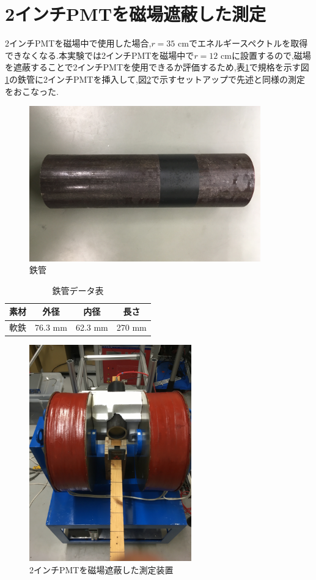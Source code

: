 \section{2インチPMTを磁場遮蔽した測定}
2インチPMTを磁場中で使用した場合,$r=35$ cmでエネルギースペクトルを取得できなくなる.本実験では2インチPMTを磁場中で$r=12$ cmに設置するので,磁場を遮蔽することで2インチPMTを使用できるか評価するため,表\ref{ironpipedata}で規格を示す図\ref{ironpipe}の鉄管に2インチPMTを挿入して,図\ref{2inchinFe}で示すセットアップで先述と同様の測定をおこなった.

\begin{figure}[tbp]
	\centering
		\includegraphics[width=10cm]{fig/iguchi/ironpipe.JPG}
	\caption{鉄管}
	\label{ironpipe}
\end{figure}

\begin{table}[tbp]
	\centering
	 \begin{tabular}{cccc} \hline
		素材 & 外径 & 内径 & 長さ \\ \hline \hline
		軟鉄 & 76.3 mm & 62.3 mm & 270 mm \\ \hline
	\end{tabular}
	  \caption{鉄管データ表}
	  \label{ironpipedata}
\end{table}

\begin{figure}[tbp]
	\centering
		\includegraphics[width=7cm]{fig/iguchi/2inchinFe.jpg}
	\caption{2インチPMTを磁場遮蔽した測定装置}
	\label{2inchinFe}
\end{figure}

